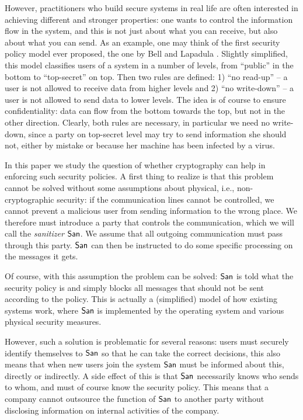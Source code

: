 \documentclass{llncs}
\begin{document}
However, practitioners who build secure systems in real life are often interested in achieving different and 
stronger properties: one wants to control the information flow in the system, and this is not just about 
what you can receive, but also about what you can send. As an example, one may think of the first security 
policy model ever proposed, the one by Bell and Lapadula \cite{lapadula1996secure}. Slightly simplified,  
this model classifies users of a system in a number of levels, from ``public''  in the bottom to 
``top-secret'' on top. Then two rules are defined: 1) ``no read-up'' -- a user is not allowed to receive
 data from higher levels and 2) ``no write-down'' -- a user is not allowed to send data to lower levels. 
 The idea is of course to ensure confidentiality: data can flow from the bottom towards the top, but not in
 the other direction. Clearly, 
both rules are necessary, in particular we need no write-down, since a party on top-secret level may try to 
send information she should not, either by mistake or because her machine has been infected by a virus.

In this paper we study the question of whether cryptography can help in enforcing such security policies.
A first thing to realize is that this problem cannot be solved without some assumptions about physical, 
i.e.,  non-cryptographic security: if the communication lines cannot be controlled, we cannot prevent a 
malicious user 
from sending information to the wrong place. We therefore must introduce a party that controls
the communication, which we will call the 
\emph{sanitizer} $\mathsf{San}$. We assume that all outgoing communication must pass through this party. 
$\mathsf{San}$ can then be instructed to do some specific processing on the messages it gets.

Of course, with this assumption the problem can be solved: $\mathsf{San}$ is told what the security policy is and simply blocks all messages that should not be sent according to the policy. This is actually a (simplified) model of how existing systems work, where $\mathsf{San}$ is implemented by the operating system and various physical security measures.

However, such a solution is problematic for several reasons: users must securely identify themselves to
$\mathsf{San}$ so that he can take the correct decisions, this also means that when new users join the system
$\mathsf{San}$ must be informed about this, directly or indirectly.  A side effect  of this is that $\mathsf{San}$ necessarily 
knows who sends to whom, and must of course know the security policy. This means that a company cannot outsource the function of $\mathsf{San}$ to  another party without disclosing information on internal activities of the company.
\end{document}
